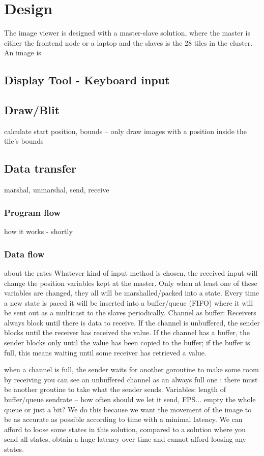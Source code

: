 \documentclass[12pt, a4paper, oneside]{article}
\begin{document}
\section{Design}
The image viewer is designed with a master-slave solution, where the master is either the frontend node or a laptop and the slaves is the 28 tiles in the cluster. An image is 
\subsection{Display Tool - Keyboard input}
\subsection{Draw/Blit}
calculate start position, bounds – only draw images with a position inside the tile's bounds
\subsection{Data transfer}
marshal, unmarshal, send, receive
\subsubsection{Program flow}
how it works  - shortly
\subsubsection{Data flow}
about the rates\newline
Whatever kind of input method is chosen, the received input will change the position variables kept at the master. Only when at least one of these variables are changed, they all will be marshalled/packed into a state. Every time a new state is paced it will be inserted into a buffer/queue (FIFO)  where it will be sent out as a multicast to the slaves periodically.
\newline
\newline
Channel as buffer:
Receivers always block until there is data to receive. If the channel is unbuffered, the sender blocks until the receiver has received the value. If the channel has a buffer, the sender blocks only until the value has been copied to the buffer; if the buffer is full, this means waiting until some receiver has retrieved a value.

when a channel is full, the sender waits for another goroutine to make some room by receiving
you can see an unbuffered channel as an always full one : there must be another groutine to take what the sender sends.
\newline
\newline
Variables:
length of buffer/queue
sendrate – how often should we let it send, FPS...
empty the whole queue or just a bit?
\newline
\newline
We do this because we want the movement of the image to be as accurate as possible according to time with a minimal latency. 
We can afford to loose some states in this solution, compared to a solution where you send all states, obtain a huge latency over time and cannot afford loosing any states.
\end{document}
